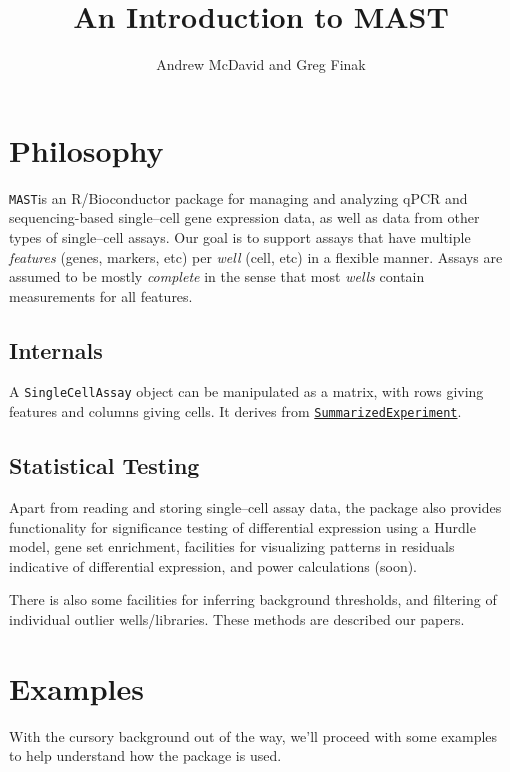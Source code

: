 \documentclass{article}\usepackage[]{graphicx}\usepackage[usenames,dvipsnames]{color}
\newcommand{\mast}{\texttt{MAST}}
\begin{document}
\title{An Introduction to MAST}


\author{Andrew McDavid and Greg Finak}

\maketitle
\section{Philosophy}
 \mast is an R/Bioconductor package for managing and analyzing qPCR and sequencing-based single--cell gene expression
 data, as well as data from other types of single--cell assays. 
Our goal is to support assays that have multiple \emph{features} (genes,
markers, etc) per \emph{well} (cell, etc) in a flexible manner.
Assays are assumed to be  mostly \emph{complete} in the sense that most \emph{wells}
contain measurements for all features.

\subsection{Internals}
A \texttt{SingleCellAssay} object can be manipulated as a matrix, with rows giving features and columns giving cells.
It derives from \href{http://bioconductor.org/packages/release/bioc/html/SummarizedExperiment.html}{\texttt{SummarizedExperiment}}.

\subsection{Statistical Testing}
Apart from reading and storing single--cell assay data, the package also
provides functionality for significance testing of differential expression using a Hurdle model, gene set enrichment, facilities for visualizing patterns in residuals indicative of differential expression, and power calculations (soon).

There is also some facilities for inferring background thresholds, and filtering of individual outlier wells/libraries. 
These methods are described our papers. 

\section{Examples}

With the cursory background out of the way, we'll proceed with some examples
to help understand how the package is used.
\end{document}
